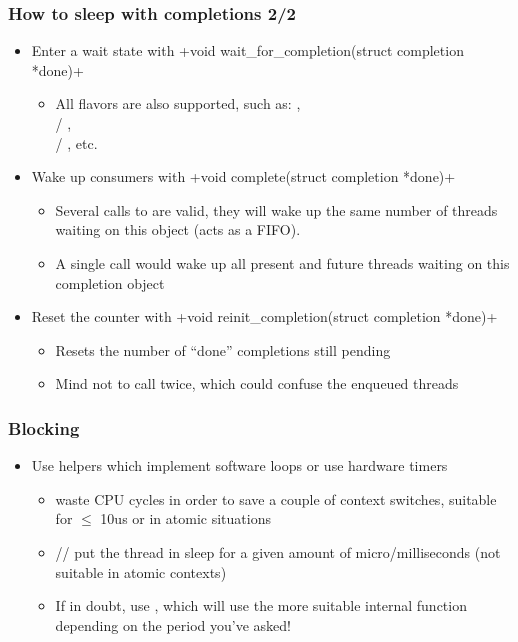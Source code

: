 \begin{frame}[fragile]
  \newcommand\kfuncbis[2]{\href{https://elixir.bootlin.com/linux/latest/ident/#1}{\codelink{#2()}}}
  \frametitle{How to sleep with completions 2/2}
  \begin{itemize}
  \item Enter a wait state with +void wait_for_completion(struct completion *done)+
    \begin{itemize}
    \item All  flavors are also supported, such as:
      , \\
       /
      \kfuncbis{wait_for_completion_interruptible_timeout}{_timeout}, \\
       /
      \kfuncbis{wait_for_completion_killable_timeout}{_timeout}, etc.
    \end {itemize}
  \item Wake up consumers with
    +void complete(struct completion *done)+
    \begin{itemize}
    \item Several calls to  are valid, they will wake up
      the same number of threads waiting on this object (acts as a FIFO).
    \item A single  call would wake up all present and
      future threads waiting on this completion object
    \end {itemize}
  \item Reset the counter with
    +void reinit_completion(struct completion *done)+
    \begin{itemize}
    \item Resets the number of ``done'' completions still pending
    \item Mind not to call  twice, which could
      confuse the enqueued threads

    \end{itemize}
  \end{itemize}
\end{frame}

\begin{frame}[fragile]
  \frametitle{Blocking}
  \begin{itemize}
  \item Use helpers which implement software loops or use hardware timers
    \begin{itemize}
    \item {} waste CPU cycles in order to save a couple of
      context switches, suitable for $\le$ 10us or in atomic situations
    \item {}// put the
      thread in sleep for a given amount of micro/milliseconds
      (not suitable in atomic contexts)
    \item If in doubt, use , which will use the more suitable
      internal function depending on the period you've asked!
    \end{itemize}
  \end{itemize}
\end{frame}

